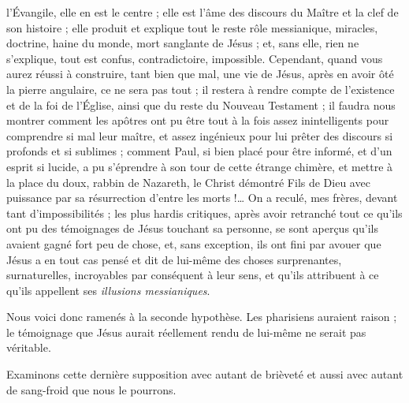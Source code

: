 l’Évangile, elle en est le centre ; elle est l’âme des discours du Maître et la clef de son histoire ; elle produit et explique tout le reste\frcolon{} rôle messianique, miracles, doctrine, haine du monde, mort sanglante de Jésus ; et, sans elle, rien ne s’explique, tout est confus, contradictoire, impossible. Cependant, quand vous aurez réussi à construire, tant bien que mal, une vie de Jésus, après en avoir ôté la pierre angulaire, ce ne sera pas tout ; il restera à rendre compte de l’existence et de la foi de l’Église, ainsi que du reste du Nouveau Testament ; il faudra nous montrer comment les apôtres ont pu être tout à la fois assez inintelligents pour comprendre si mal leur maître, et assez ingénieux pour lui prêter des discours si profonds et si sublimes ; comment Paul, si bien placé pour être informé, et d’un esprit si lucide, a pu s’éprendre à son tour de cette étrange chimère, et mettre à la place du doux, rabbin de Nazareth, le Christ démontré Fils de Dieu avec puissance par sa résurrection d’entre les morts !… On a reculé, mes frères, devant tant d’impossibilités ; les plus hardis critiques, après avoir retranché tout ce qu’ils ont pu des témoignages de Jésus touchant sa personne, se sont aperçus qu’ils avaient gagné fort peu de chose, et, sans exception, ils ont fini par avouer que Jésus a en tout cas pensé et dit de lui-même des choses surprenantes, surnaturelles, incroyables par conséquent à leur sens, et qu’ils attribuent à ce qu’ils appellent ses \emph{illusions messianiques}.

Nous voici donc ramenés à la seconde hypothèse. Les pharisiens auraient raison ; le témoignage que Jésus aurait réellement rendu de lui-même ne serait pas véritable.

Examinons cette dernière supposition avec autant de brièveté et aussi avec autant de sang-froid que nous le pourrons.

